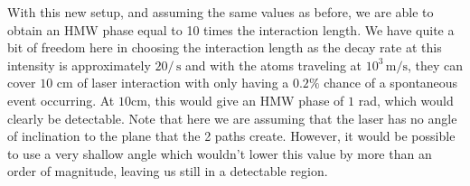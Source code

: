 \documentclass[twocolumn,english,pra,aps,superscriptaddress,floatfix]{revtex4-1}
\begin{document}
With this new setup, and assuming the same values as before, we are able to obtain an HMW phase equal to 10 times the interaction length.  We have quite a bit of freedom here in choosing the interaction length as the decay rate at this intensity is approximately $20/\,\mathrm{s}$ and with the atoms traveling at $10^3\,\mathrm{m/s}$, they can cover $10$ cm of laser interaction with only having a $0.2\%$ chance of a spontaneous event occurring.  
At $10$cm, this would give an HMW phase of $1$ rad, which would clearly be detectable.  Note that here we are assuming that the laser has no angle of inclination to the plane that the 2 paths create.  However, it would be possible to use a very shallow angle which wouldn't lower this value by more than an order of magnitude, leaving us still in a detectable region.

\vspace{5mm}
\end{document}
